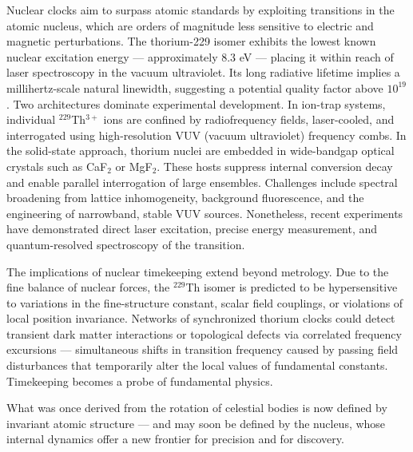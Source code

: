Nuclear clocks aim to surpass atomic standards by exploiting transitions in the atomic nucleus, which are orders of magnitude less sensitive to electric and magnetic perturbations. The thorium-229 isomer exhibits the lowest known nuclear excitation energy — approximately 8.3 eV — placing it within reach of laser spectroscopy in the vacuum ultraviolet. Its long radiative lifetime implies a millihertz-scale natural linewidth, suggesting a potential quality factor above $10^{19}$. Two architectures dominate experimental development. In ion-trap systems, individual $^{229}$Th$^{3+}$ ions are confined by radiofrequency fields, laser-cooled, and interrogated using high-resolution VUV (vacuum ultraviolet) frequency combs. In the solid-state approach, thorium nuclei are embedded in wide-bandgap optical crystals such as CaF$_2$ or MgF$_2$. These hosts suppress internal conversion decay and enable parallel interrogation of large ensembles. Challenges include spectral broadening from lattice inhomogeneity, background fluorescence, and the engineering of narrowband, stable VUV sources. Nonetheless, recent experiments have demonstrated direct laser excitation, precise energy measurement, and quantum-resolved spectroscopy of the transition.

The implications of nuclear timekeeping extend beyond metrology. Due to the fine balance of nuclear forces, the $^{229}$Th isomer is predicted to be hypersensitive to variations in the fine-structure constant, scalar field couplings, or violations of local position invariance. Networks of synchronized thorium clocks could detect transient dark matter interactions or topological defects via correlated frequency excursions — simultaneous shifts in transition frequency caused by passing field disturbances that temporarily alter the local values of fundamental constants. Timekeeping becomes a probe of fundamental physics.

What was once derived from the rotation of celestial bodies is now defined by invariant atomic structure — and may soon be defined by the nucleus, whose internal dynamics offer a new frontier for precision and for discovery.
